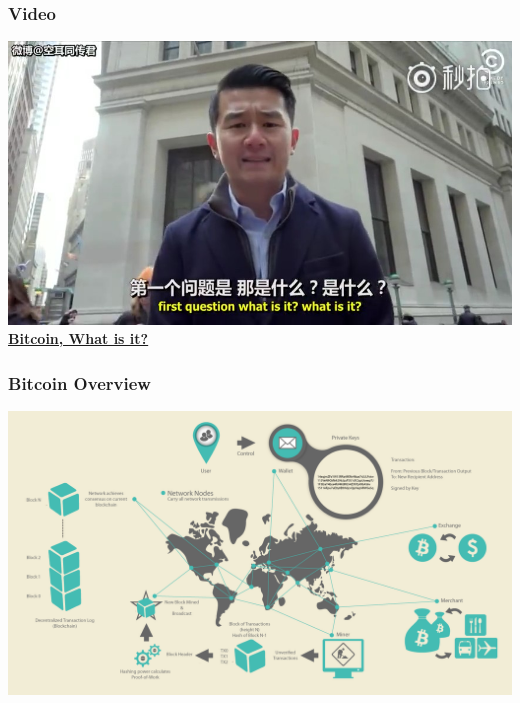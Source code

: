 \begin{frame}
    \frametitle{Video}
    \begin{center}
        \includegraphics[scale=0.35]{./figures/what-it-it.jpg} \\
        \href{run:cryptocurrency.mp4}{\textbf{Bitcoin, What is it?}}
    \end{center}
\end{frame}

\begin{frame}
    \frametitle{Bitcoin Overview}
    \includegraphics[scale=1]{./figures/mbc2_0201.png}
\end{frame}

